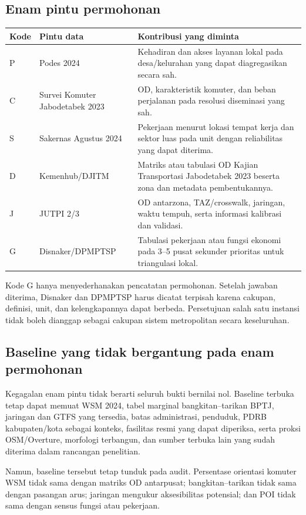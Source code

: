 \documentclass[10pt]{article}
\begin{document}
\subsection{Enam pintu permohonan}

\begin{tabularx}{\textwidth}{@{}P{0.07\textwidth}P{0.28\textwidth}Y@{}}
\toprule
Kode & Pintu data & Kontribusi yang diminta \\
\midrule
P & Podes 2024 & Kehadiran dan akses layanan lokal pada desa/kelurahan yang dapat diagregasikan secara sah. \\
C & Survei Komuter Jabodetabek 2023 & OD, karakteristik komuter, dan beban perjalanan pada resolusi diseminasi yang sah. \\
S & Sakernas Agustus 2024 & Pekerjaan menurut lokasi tempat kerja dan sektor luas pada unit dengan reliabilitas yang dapat diterima. \\
D & Kemenhub/DJITM & Matriks atau tabulasi OD Kajian Transportasi Jabodetabek 2023 beserta zona dan metadata pembentukannya. \\
J & JUTPI 2/3 & OD antarzona, TAZ/crosswalk, jaringan, waktu tempuh, serta informasi kalibrasi dan validasi. \\
G & Disnaker/DPMPTSP & Tabulasi pekerjaan atau fungsi ekonomi pada 3--5 pusat sekunder prioritas untuk triangulasi lokal. \\
\bottomrule
\end{tabularx}

Kode G hanya menyederhanakan pencatatan permohonan. Setelah jawaban diterima, Disnaker dan DPMPTSP harus dicatat terpisah karena cakupan, definisi, unit, dan kelengkapannya dapat berbeda. Persetujuan salah satu instansi tidak boleh dianggap sebagai cakupan sistem metropolitan secara keseluruhan.

\subsection{Baseline yang tidak bergantung pada enam permohonan}

Kegagalan enam pintu tidak berarti seluruh bukti bernilai nol. Baseline terbuka tetap dapat memuat WSM 2024, tabel marginal bangkitan--tarikan BPTJ, jaringan dan GTFS yang tersedia, batas administrasi, penduduk, PDRB kabupaten/kota sebagai konteks, fasilitas resmi yang dapat diperiksa, serta proksi OSM/Overture, morfologi terbangun, dan sumber terbuka lain yang sudah diterima dalam rancangan penelitian.

Namun, baseline tersebut tetap tunduk pada audit. Persentase orientasi komuter WSM tidak sama dengan matriks OD antarpusat; bangkitan--tarikan tidak sama dengan pasangan arus; jaringan mengukur aksesibilitas potensial; dan POI tidak sama dengan sensus fungsi atau pekerjaan.
\end{document}
